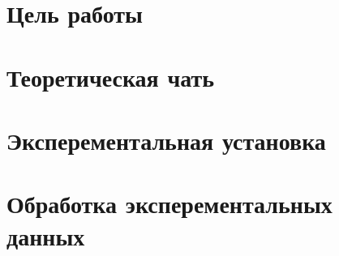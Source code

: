 


    

    \section*{Цель работы}

    \section*{Теоретическая чать}

    \section*{Эксперементальная установка}

    \section*{Обработка эксперементальных данных}
